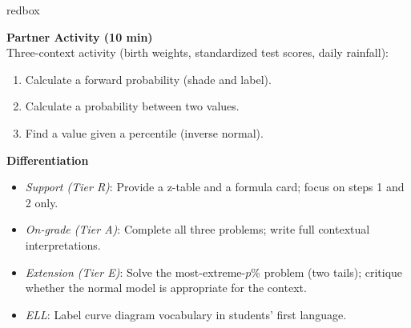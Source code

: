 \documentclass[10pt]{article}
\begin{document}
\begin{skillbox}{redbox}
\begin{minipage}[t]{0.48\linewidth}
    \textbf{Partner Activity (10 min)}\\
    Three-context activity (birth weights, standardized test scores, daily rainfall):
    \begin{enumerate}
        \item Calculate a forward probability (shade and label).
        \item Calculate a probability between two values.
        \item Find a value given a percentile (inverse normal).
    \end{enumerate}
\end{minipage}
\hfill
\begin{minipage}[t]{0.48\linewidth}
    \textbf{Differentiation}
    \begin{itemize}
        \item \textit{Support (Tier R)}: Provide a z-table and a formula card; focus on
              steps 1 and 2 only.
        \item \textit{On-grade (Tier A)}: Complete all three problems; write full
              contextual interpretations.
        \item \textit{Extension (Tier E)}: Solve the most-extreme-$p\%$ problem (two
              tails); critique whether the normal model is appropriate for the context.
        \item \textit{ELL}: Label curve diagram vocabulary in students' first language.
    \end{itemize}
\end{minipage}
\end{skillbox}
\end{document}
